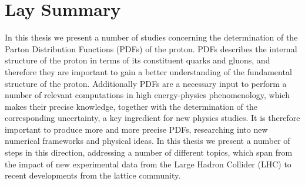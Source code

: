 \chapter*{Lay Summary}
In this thesis we present a number of studies concerning the determination of the
Parton Distribution Functions (PDFs) of the proton. 
PDFs describes the internal structure of the proton in terms of its constituent
quarks and gluons, and therefore they are important to gain a better understanding 
of the fundamental structure of the proton.
Additionally PDFs are a necessary input to perform a number of relevant computations
in high energy-physics phenomenology, which makes
their precise knowledge, together with the determination of the corresponding uncertainty,
a key ingredient for new physics studies. 
It is therefore important to produce more and more precise PDFs,
researching into new numerical frameworks and physical ideas. 
In this thesis we present a number of steps in this direction, addressing a number of different topics,
which span from the impact of new experimental data from the Large Hadron Collider (LHC)
to recent developments from the lattice community.


